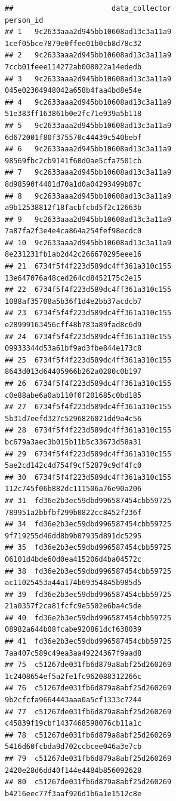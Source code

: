 \documentclass[]{article}
\begin{document}
\begin{verbatim}
##                       data_collector                          person_id
## 1   9c2633aaa2d945bb10608ad13c3a11a9   1cef05bce7879e0ffee01b0cb8d78c32
## 2   9c2633aaa2d945bb10608ad13c3a11a9   7ccb01feee114272ab008022a14ededb
## 3   9c2633aaa2d945bb10608ad13c3a11a9   045e02304948042a658b4faa4bd8e54e
## 4   9c2633aaa2d945bb10608ad13c3a11a9   51e383ff163861b0e2fc71e939a5b118
## 5   9c2633aaa2d945bb10608ad13c3a11a9   6d672001f80f375570c44439c540bebf
## 6   9c2633aaa2d945bb10608ad13c3a11a9   98569fbc2cb9141f60d0ae5cfa7501cb
## 7   9c2633aaa2d945bb10608ad13c3a11a9   8d98590f4401d70a1d0a04293499b87c
## 8   9c2633aaa2d945bb10608ad13c3a11a9   a9b12538812f18facbfcbd5f2c12663b
## 9   9c2633aaa2d945bb10608ad13c3a11a9   7a87fa2f3e4e4ca864a254fef98ecdc0
## 10  9c2633aaa2d945bb10608ad13c3a11a9   8e231231fb1ab2d42c266670295eee16
## 21  6734f5f4f223d589dc4ff361a310c155   13e647076a48ced264cd8452175c2e15
## 22  6734f5f4f223d589dc4ff361a310c155   1088af35708a5b36f1d4e2bb37acdcb7
## 23  6734f5f4f223d589dc4ff361a310c155   e28999163456cff48b783a89fad8c6d9
## 24  6734f5f4f223d589dc4ff361a310c155   09933344d53a61bf9ad3fbe844e173c8
## 25  6734f5f4f223d589dc4ff361a310c155   8643d013d64405966b262a0280c0b197
## 26  6734f5f4f223d589dc4ff361a310c155   c0e88abe6a0ab110f0f201685c0bd185
## 27  6734f5f4f223d589dc4ff361a310c155   5b31d7eefd327c5296826021dd9a4c56
## 28  6734f5f4f223d589dc4ff361a310c155   bc679a3aec3b015b11b5c33673d58a31
## 29  6734f5f4f223d589dc4ff361a310c155   5ae2cd142c4d754f9cf52879c9df4fc0
## 30  6734f5f4f223d589dc4ff361a310c155   112c745f06b882dc111506a76e90a206
## 31  fd36e2b3ec59dbd996587454cbb59725   789951a2bbfbf299b0822cc8452f236f
## 34  fd36e2b3ec59dbd996587454cbb59725   9f719255d46dd8b9b07935d891dc5295
## 35  fd36e2b3ec59dbd996587454cbb59725   06101d4bde60d0ea415206d4ba04572c
## 38  fd36e2b3ec59dbd996587454cbb59725   ac11025453a44a174b69354845b985d5
## 39  fd36e2b3ec59dbd996587454cbb59725   21a0357f2ca81fcfc9e5502e6ba4c5de
## 40  fd36e2b3ec59dbd996587454cbb59725   08982a644b08fcabe920861dcf638039
## 41  fd36e2b3ec59dbd996587454cbb59725   7aa407c589c49ea3aa49224367f9aad8
## 75  c51267de031fb6d879a8abf25d260269   1c2408654ef5a2fe1fc962088312266c
## 76  c51267de031fb6d879a8abf25d260269   9b2cfcfa9664443aaa0a5cf1333c7244
## 77  c51267de031fb6d879a8abf25d260269   c45839f19cbf1437468598076cb11a1c
## 78  c51267de031fb6d879a8abf25d260269   5416d60fcbda9d702ccbcee046a3e7cb
## 79  c51267de031fb6d879a8abf25d260269   2420e28d6dd40f144e4484b856092628
## 80  c51267de031fb6d879a8abf25d260269   b4216eec77f3aaf926d1b6a1e1512c8e

\end{verbatim}
\end{document}

